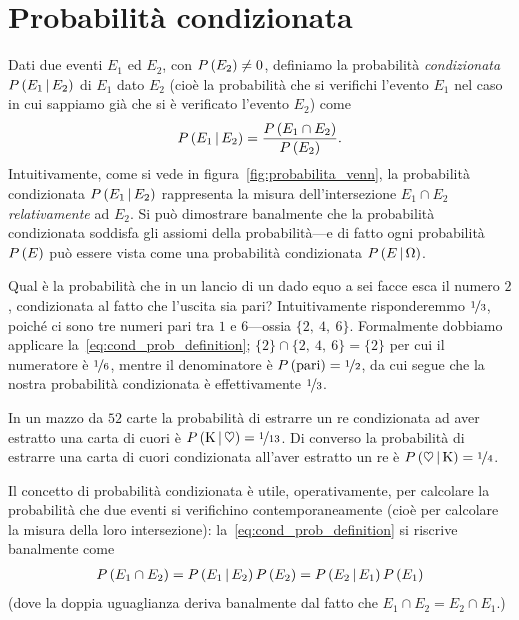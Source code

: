 \section{Probabilità condizionata}

Dati due eventi $E_1$ ed $E_2$, con $\displaystyle P\left(E_2\right) \neq 0$, definiamo la
probabilità \emph{condizionata} $\displaystyle P\left(E_1 \,|\, E_2\right)$ di $E_1$ dato $E_2$
(cioè la probabilità che si verifichi l'evento $E_1$ nel caso in cui sappiamo
già che si è verificato l'evento $E_2$) come
\begin{align}\label{eq:cond_prob_definition}
  \displaystyle P\left(E_1 \,|\, E_2\right) = \frac{\displaystyle P\left(E_1 \cap E_2\right)}{\displaystyle P\left(E_2\right)}.
\end{align}
Intuitivamente, come si vede in figura~\ref{fig:probabilita_venn}, la
probabilità condizionata $\displaystyle P\left(E_1 \,|\, E_2\right)$ rappresenta la misura
dell'intersezione $E_1 \cap E_2$ \emph{relativamente} ad $E_2$. Si può
dimostrare banalmente che la probabilità condizionata soddisfa gli assiomi
della probabilità---e di fatto ogni probabilità $\displaystyle P\left(E\right)$ può essere
vista come una probabilità condizionata $\displaystyle P\left(E \,|\, \Omega\right)$.

\begin{examplebox}
  \begin{example}
    Qual è la probabilità che in un lancio di un dado equo a sei facce esca
    il numero $2$, condizionata al fatto che l'uscita sia pari? Intuitivamente
    risponderemmo $\nicefrac{1}{3}$, poiché ci sono tre numeri pari tra
    $1$ e $6$---ossia $\{2,~4,~6\}$. Formalmente dobbiamo applicare
    la~\eqref{eq:cond_prob_definition}; $\{2\} \cap \{2,~4,~6\} = \{2\}$ per
    cui il numeratore è $\nicefrac{1}{6}$, mentre il denominatore è
    $\displaystyle P\left(\text{pari}\right) = \nicefrac{1}{2}$, da cui segue che la nostra
    probabilità condizionata è effettivamente $\nicefrac{1}{3}$.
  \end{example}

  \begin{example}
    In un mazzo da $52$ carte la probabilità di estrarre un re condizionata
    ad aver estratto una carta di cuori è
    $\displaystyle P\left(\text{K} \,|\, \heartsuit\right) = \nicefrac{1}{13}$. Di
    converso la probabilità di estrarre una carta di cuori condizionata
    all'aver estratto un re è
    $\displaystyle P\left(\heartsuit \,|\, \text{K}\right) = \nicefrac{1}{4}$.
  \end{example}
\end{examplebox}

Il concetto di probabilità condizionata è utile, operativamente, per
calcolare la probabilità che due eventi si verifichino contemporaneamente
(cioè per calcolare la misura della loro intersezione):
la~\eqref{eq:cond_prob_definition} si riscrive banalmente come
\begin{align}\label{eq:prob_intersection}
  \displaystyle P\left(E_1 \cap E_2\right) = \displaystyle P\left(E_1 \,|\, E_2\right)\displaystyle P\left(E_2\right) =
  \displaystyle P\left(E_2 \,|\, E_1\right)\displaystyle P\left(E_1\right)
\end{align}
(dove la doppia uguaglianza deriva banalmente dal fatto che
$E_1 \cap E_2 = E_2 \cap E_1$.)



